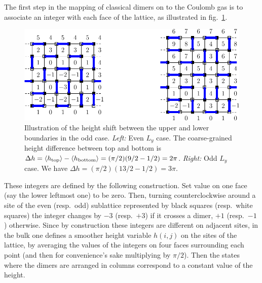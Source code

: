 \documentclass[11pt]{iopart}
\begin{document}
The first step in the mapping of classical dimers on to the Coulomb gas is to associate an integer with each face of the lattice, as illustrated in fig.~\ref{fig:height_shift}.
\begin{figure}[ht]
 \begin{center}
 \includegraphics[scale=0.8]{./figures/shift.pdf}
 \end{center}
\caption{Illustration of the height shift between the upper and lower boundaries in the odd case.  \emph{Left:} Even $L_y$ case. The coarse-grained height difference between top and bottom is $\Delta h=\langle h_{\rm top}\rangle-\langle h_{\rm bottom}\rangle=(\pi/2)(9/2-1/2)=2\pi$.  \emph{Right:} Odd $L_y$ case. We have $\Delta h=(\pi/2)(13/2-1/2)=3\pi$.}
\label{fig:height_shift}
\end{figure}
These integers are defined by the following construction. Set value on one face (say the lower leftmost one) to be zero. Then, turning counterclockwise around a site of the even (resp.\ odd) sublattice represented by black squares (resp.\ white squares) the integer changes by $-3$ (resp.\ $+3$) if it crosses a dimer, $+1$ (resp.\ $-1$) otherwise. Since by construction these integers are different on adjacent sites, in the bulk one defines a smoother height variable $h(i,j)$ on the sites of the lattice, by averaging the values of the integers on four faces surrounding each point (and then for convenience's sake multiplying by $\pi/2$). Then the states where the dimers are arranged in columns correspond to a constant value of the height.
\end{document}
